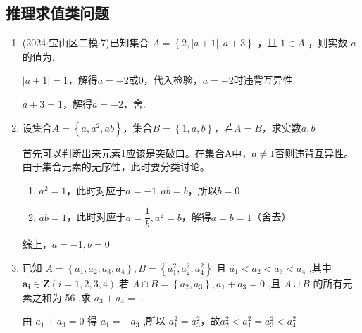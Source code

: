 \subsection*{推理求值类问题}
\begin{enumerate}
    \item (2024$\cdot$宝山区二模$\cdot$7)已知集合 $A = \left\{  {2,\left| {a + 1}\right| ,a + 3}\right\}$ ，且 $1 \in  A$ ，则实数 $a$ 的值为.
    \begin{jieda}
        $|a+1| = 1$，解得$a = -2$或$0$，代入检验，$a = -2$时违背互异性.

        $a+3 = 1$，解得$a = -2$，舍.
    \end{jieda}
    \item 设集合$A = \left\{a, a^2, ab\right\}$，集合$B = \left\{1, a, b\right\}$，若$A = B$，求实数$a,b$
    \begin{jieda}
        首先可以判断出来元素1应该是突破口。在集合A中，$a \neq 1$否则违背互异性。由于集合元素的无序性，此时要分类讨论。
        \begin{enumerate}
            \item $a^2 = 1$，此时对应于$a = -1, ab = b$，所以$b = 0$
            \item $ab = 1$，此时对应于$a = \dfrac{1}{b}, a^2 = b$，解得$a = b = 1$（舍去）
        \end{enumerate}
        综上，$a = -1, b = 0$
    \end{jieda}
    \item 已知 $A = \left\{  {{a}_{1},{a}_{2},{a}_{3},{a}_{4}}\right\}  ,B = \left\{  {{a}_{1}^{2},{a}_{2}^{2},{a}_{4}^{2}}\right\}$ 且 ${a}_{1} < {a}_{2} < {a}_{3} < {a}_{4}$ ,其中 ${\mathbf{a}}_{\mathbf{i}} \in  \mathbf{Z}(i = 1,2,3,4)$,若 $A \cap  B = \left\{  {{a}_{2},{a}_{3}}\right\}  ,{a}_{1} + {a}_{3} = 0$ ,且 $A \cup  B$ 的所有元素之和为 56 ,求 ${a}_{3} + {a}_{4} =$ .
    \begin{jieda}
        由 ${a}_{1} + {a}_{3} = 0$ 得 ${a}_{1} =  - {a}_{3}$ ,所以 ${a}_{1}^{2} = {a}_{3}^{2}$，故$a_2^2 < a_1^2 = a_3^2 < a_4^2$


\end{jieda}
\end{enumerate}
